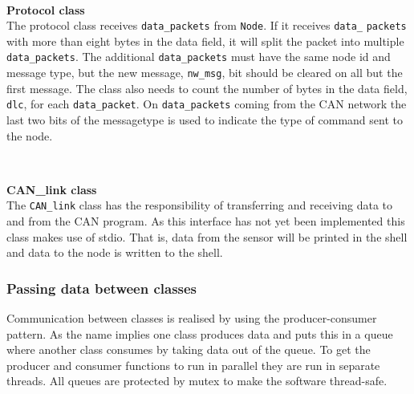 ~\\ \par \textbf{Protocol class} ~ \\

The protocol class receives \texttt{data\_packets} from \texttt{Node}. 
If it receives \texttt{data\_} \texttt{packets} with more than eight bytes in the data field, it will split the packet into multiple \texttt{data\_packets}.
The additional \texttt{data\_packets} must have the same node id and message type, but the new message, \texttt{nw\_msg}, bit should be cleared on all but the first message.
The class also needs to count the number of bytes in the data field, \texttt{dlc}, for each \texttt{data\_packet}.
On \texttt{data\_packets} coming from the CAN network the last two bits of the messagetype is used to indicate the type of command sent to the node.

~\\ \par \textbf{CAN\_link class} ~ \\
The \texttt{CAN\_link} class has the responsibility of transferring and receiving data to and from the CAN program.
As this interface has not yet been implemented this class makes use of stdio. 
That is, data from the sensor will be printed in the shell and data to the node is written to the shell. 
\subsubsection*{Passing data between classes}
Communication between classes is realised by using the producer-consumer pattern.
As the name implies one class produces data and puts this in a queue where another class consumes by taking data out of the queue.
To get the producer and consumer functions to run in parallel they are run in separate threads.
All queues are protected by mutex to make the software thread-safe.

